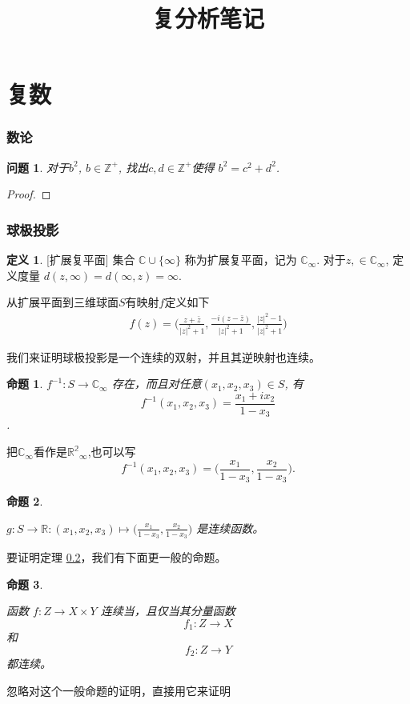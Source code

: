 \documentclass{ctexart}
\title{复分析笔记}
\newtheorem{question}{问题} %
\newtheorem{prop}{命题}[section]
\theoremstyle{definition}
\newtheorem{Definition}{定义}[section]
\begin{document}
\tableofcontents 

\part{复数}
\section*{数论}
\begin{question} 对于$b^2$, $b\in \mathbb{Z^{+}}$, 找出$c,d\in \mathbb{Z}^{+}$使得 $b^2=c^2+d^2$. 
 \end{question}
\begin{proof}  \end{proof}
\section*{球极投影}
\begin{Definition}{}[扩展复平面] 集合
    \(\mathbb{C}\cup \{\infty \}\) 称为扩展复平面，记为
    \(\mathbb{C}_{\infty}\). 对于$z,\in \mathbb{C}_{\infty}$, 定义度量 \(d(z,\infty)=d(\infty,z)=\infty\).  
\end{Definition}
从扩展平面到三维球面\(S\)有映射\(f\)定义如下
\begin{align}
    f(z)=\bigg(\frac{z+\bar{z}}{|z|^2+1} , \frac{-i(z-\bar{z})}{|z|^2+1}, \frac{|z|^2-1}{|z|^2+1}\bigg)
\end{align}


我们来证明球极投影是一个连续的双射，并且其逆映射也连续。

\begin{prop}{}
    \(f^{-1}\colon S\to \mathbb{C}_{\infty}\) 存在，而且对任意\((x_1,x_2,x_3)\in S\), 有\[f^{-1}(x_1,x_2,x_3)=\frac{x_1+ix_2}{1-x_3}\]. 
\end{prop}
把\(\mathbb{C}_{\infty}\)看作是\(\mathbb{R^2}_{\infty}\),也可以写 \[ f^{-1}(x_1,x_2,x_3)=\bigl( \frac{x_1}{1-x_3},\frac{x_2}{1-x_3} \bigl). \]
\begin{prop}\hypertarget{02}{}
    \(g\colon S\to \mathbb{R}\colon (x_1,x_2,x_3) \mapsto \bigl( \frac{x_1}{1-x_3},\frac{x_2}{1-x_3} \bigl) \) 是连续函数。
    
\end{prop}   
要证明定理 \hyperlink{02}{0.2}，我们有下面更一般的命题。
\begin{prop}\hypertarget{03}{}
    函数 \(f\colon Z\to X\times Y\) 连续当，且仅当其分量函数\[f_1\colon Z\to X\] 和 \[f_2\colon Z\to Y\] 都连续。 
\end{prop}
忽略对这个一般命题的证明，直接用它来证明
\end{document}
